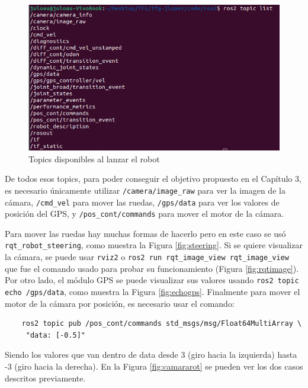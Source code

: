  \begin{figure} [h!]
	\begin{center}
		\includegraphics[width=12cm]{figs/cap6/topic.png}
	\end{center}
	\caption{Topics disponibles al lanzar el robot}
	\label{fig:topic}
\end{figure}


De todos esos topics, para poder conseguir el objetivo propuesto en el Capítulo 3, es necesario únicamente utilizar \verb|/camera/image_raw| para ver la imagen de la cámara, \verb|/cmd_vel| para mover las ruedas, \verb|/gps/data| para ver los valores de posición del \acs{GPS}, y \verb|/pos_cont/commands| para mover el motor de la cámara.

Para mover las ruedas hay muchas formas de hacerlo pero en este caso se usó \verb|rqt_robot_steering|, como muestra la Figura \ref{fig:steering}. Si se quiere visualizar la cámara, se puede usar \verb|rviz2| o \verb|ros2 run rqt_image_view rqt_image_view| que fue el comando usado para probar su funcionamiento (Figura \ref{fig:rqtimage}). Por otro lado, el módulo \acs{GPS} se puede visualizar sus valores usando \verb|ros2 topic echo /gps/data|, como muestra la Figura \ref{fig:echogps}. Finalmente para mover el motor de la cámara por posición, es necesario usar el comando: 

\begin{verbatim}
	ros2 topic pub /pos_cont/commands std_msgs/msg/Float64MultiArray \
	 "data: [-0.5]"
\end{verbatim} 

Siendo los valores que van dentro de data desde 3 (giro hacia la izquierda) hasta -3 (giro hacia la derecha). En la Figura \ref{fig:camararot} se pueden ver los dos casos descritos previamente. 



